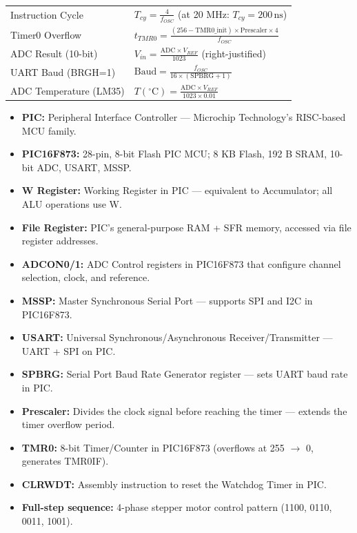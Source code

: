 \documentclass[12pt,a4paper]{article}
\renewcommand{\arraystretch}{1.45}
\begin{document}
\begin{tcolorbox}[formulabox, title={\textbf{Key Formulas at a Glance}}]
\renewcommand{\arraystretch}{1.3}
\begin{tabularx}{\linewidth}{B{4.5cm} X}
Instruction Cycle & $T_{cy} = \displaystyle\frac{4}{f_{OSC}}$ \quad (at 20 MHz: $T_{cy} = 200\,\text{ns}$) \\[4pt]
Timer0 Overflow & $t_{TMR0} = \displaystyle\frac{(256 - \text{TMR0\_init}) \times \text{Prescaler} \times 4}{f_{OSC}}$ \\[4pt]
ADC Result (10-bit) & $V_{in} = \displaystyle\frac{\text{ADC} \times V_{REF}}{1023}$ \quad (right-justified) \\[4pt]
UART Baud (BRGH=1) & $\text{Baud} = \displaystyle\frac{f_{OSC}}{16 \times (\text{SPBRG}+1)}$ \\[4pt]
ADC Temperature (LM35) & $T(^{\circ}\text{C}) = \displaystyle\frac{\text{ADC} \times V_{REF}}{1023 \times 0.01}$
\end{tabularx}
\end{tcolorbox}

\begin{tcolorbox}[defbox, title={\textbf{One-Line Definitions}}]
\begin{itemize}[leftmargin=*, itemsep=2.5pt, topsep=0pt]
  \item \textbf{PIC:} Peripheral Interface Controller --- Microchip Technology's RISC-based MCU family.
  \item \textbf{PIC16F873:} 28-pin, 8-bit Flash PIC MCU; 8 KB Flash, 192 B SRAM, 10-bit ADC, USART, MSSP.
  \item \textbf{W Register:} Working Register in PIC --- equivalent to Accumulator; all ALU operations use W.
  \item \textbf{File Register:} PIC's general-purpose RAM + SFR memory, accessed via file register addresses.
  \item \textbf{ADCON0/1:} ADC Control registers in PIC16F873 that configure channel selection, clock, and reference.
  \item \textbf{MSSP:} Master Synchronous Serial Port --- supports SPI and I2C in PIC16F873.
  \item \textbf{USART:} Universal Synchronous/Asynchronous Receiver/Transmitter --- UART + SPI on PIC.
  \item \textbf{SPBRG:} Serial Port Baud Rate Generator register --- sets UART baud rate in PIC.
  \item \textbf{Prescaler:} Divides the clock signal before reaching the timer --- extends the timer overflow period.
  \item \textbf{TMR0:} 8-bit Timer/Counter in PIC16F873 (overflows at 255 $\to$ 0, generates TMR0IF).
  \item \textbf{CLRWDT:} Assembly instruction to reset the Watchdog Timer in PIC.
  \item \textbf{Full-step sequence:} 4-phase stepper motor control pattern (1100, 0110, 0011, 1001).
\end{itemize}
\end{tcolorbox}
\end{document}
